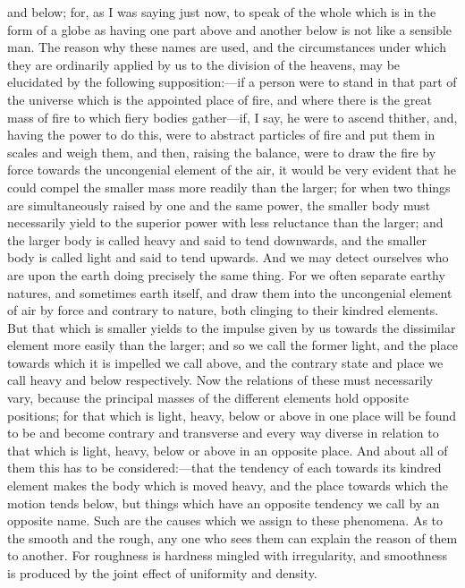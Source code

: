 \documentclass[11pt,letter]{article}
\begin{document}
and below; for, as I was saying just now, to speak of the whole which is in the form of a globe as having one part above and another below is not like a sensible man. The reason why these names are used, and the circumstances under which they are ordinarily applied by us to the division of the heavens, may be elucidated by the following supposition:—if a person were to stand in that part of the universe which is the appointed place of fire, and where there is the great mass of fire to which fiery bodies gather—if, I say, he were to ascend thither, and, having the power to do this, were to abstract particles of fire and put them in scales and weigh them, and then, raising the balance, were to draw the fire by force towards the uncongenial element of the air, it would be very evident that he could compel the smaller mass more readily than the larger; for when two things are simultaneously raised by one and the same power, the smaller body must necessarily yield to the superior power with less reluctance than the larger; and the larger body is called heavy and said to tend downwards, and the smaller body is called light and said to tend upwards. And we may detect ourselves who are upon the earth doing precisely the same thing. For we often separate earthy natures, and sometimes earth itself, and draw them into the uncongenial element of air by force and contrary to nature, both clinging to their kindred elements. But that which is smaller yields to the impulse given by us towards the dissimilar element more easily than the larger; and so we call the former light, and the place towards which it is impelled we call above, and the contrary state and place we call heavy and below respectively. Now the relations of these must necessarily vary, because the principal masses of the different elements hold opposite positions; for that which is light, heavy, below or above in one place will be found to be and become contrary and transverse and every way diverse in relation to that which is light, heavy, below or above in an opposite place. And about all of them this has to be considered:—that the tendency of each towards its kindred element makes the body which is moved heavy, and the place towards which the motion tends below, but things which have an opposite tendency we call by an opposite name. Such are the causes which we assign to these phenomena. As to the smooth and the rough, any one who sees them can explain the reason of them to another. For roughness is hardness mingled with irregularity, and smoothness is produced by the joint effect of uniformity and density.
\end{document}
